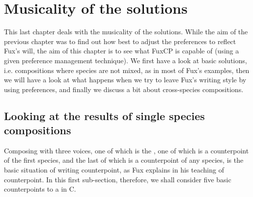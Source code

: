 \chapter{Musicality of the solutions}\label{chapter:musicality}
This last chapter deals with the musicality of the solutions. While the aim of the previous chapter was to find out how best to adjust the preferences to reflect Fux's will, the aim of this chapter is to see what FuxCP is capable of (using a given preference management technique). We first have a look at basic solutions, i.e. compositions where species are not mixed, as in most of Fux's examples, then we will have a look at what happens when we try to leave Fux's writing style by using preferences, and finally we discuss a bit about cross-species compositions.

\section{Looking at the results of single species compositions}
Composing with three voices, one of which is the \cf, one of which is a counterpoint of the first species, and the last of which is a counterpoint of any species, is the basic situation of writing counterpoint, as Fux explains in his teaching of counterpoint. In this first sub-section, therefore, we shall consider five basic counterpoints to a \cfs in C.

